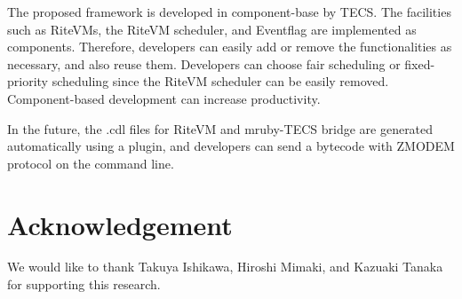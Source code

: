 \documentclass{sig-alternate-05-2015}
\begin{document}
The proposed framework is developed in component-base by TECS.
The facilities such as RiteVMs, the RiteVM scheduler, and Eventflag are implemented as components.
Therefore, developers can easily add or remove the functionalities as necessary, and also reuse them.
Developers can choose fair scheduling or fixed-priority scheduling since the RiteVM scheduler can be easily removed.
Component-based development can increase productivity.

In the future, the .cdl files for RiteVM and mruby-TECS bridge are generated automatically using a plugin, and developers can send a bytecode with ZMODEM protocol on the command line.

\section{Acknowledgement}
    We would like to thank Takuya Ishikawa, Hiroshi Mimaki, and Kazuaki Tanaka for supporting this research.



\end{document}
